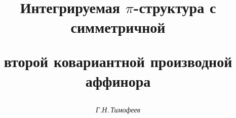 

 




 


\newcommand{\tts}[1]{} 


 




\setcounter{page}{79} 












 


\author{\it Г.Н.\,Тимофеев} 




\title{Интегрируемая $\pi$-структура с симметричной  


второй ковариантной производной аффинора } 


 


\date{} 




\pagestyle{plain} %


 




\maketitle 


\label{begin} 


 


